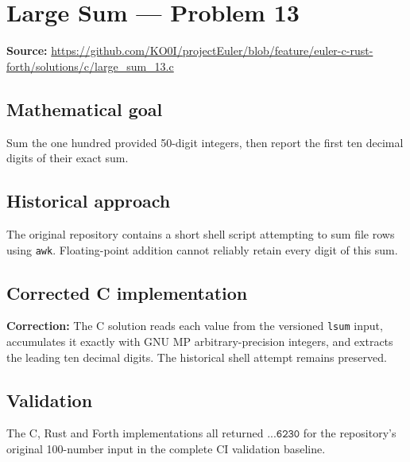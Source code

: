 \section{Large Sum --- Problem 13}
\label{prob:13}
\noindent\textbf{Source:} \url{https://github.com/KO0I/projectEuler/blob/feature/euler-c-rust-forth/solutions/c/large_sum_13.c}
\subsection*{Mathematical goal}
Sum the one hundred provided 50-digit integers, then report the first ten decimal digits of their exact sum.
\subsection*{Historical approach}
The original repository contains a short shell script attempting to sum file rows using \texttt{awk}. Floating-point addition cannot reliably retain every digit of this sum.
\subsection*{Corrected C implementation}
{\color{red}\textbf{Correction:} The C solution reads each value from the versioned \texttt{lsum} input, accumulates it exactly with GNU MP arbitrary-precision integers, and extracts the leading ten decimal digits. The historical shell attempt remains preserved.}
\subsection*{Validation}
The C, Rust and Forth implementations all returned \(\texttt{...6230}\) for the repository's original 100-number input in the complete CI validation baseline.
